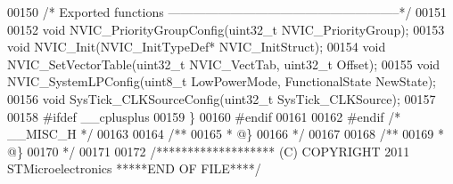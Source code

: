 \begin{DoxyCode}
00150 \textcolor{comment}{/* Exported functions --------------------------------------------------------*/}
00151 
00152 \textcolor{keywordtype}{void} NVIC_PriorityGroupConfig(uint32\_t NVIC\_PriorityGroup);
00153 \textcolor{keywordtype}{void} NVIC_Init(NVIC\_InitTypeDef* NVIC\_InitStruct);
00154 \textcolor{keywordtype}{void} NVIC_SetVectorTable(uint32\_t NVIC\_VectTab, uint32\_t Offset);
00155 \textcolor{keywordtype}{void} NVIC_SystemLPConfig(uint8\_t LowPowerMode, FunctionalState NewState);
00156 \textcolor{keywordtype}{void} SysTick_CLKSourceConfig(uint32\_t SysTick\_CLKSource);
00157 
00158 \textcolor{preprocessor}{#}\textcolor{preprocessor}{ifdef} \_\_cplusplus
00159 \}
00160 \textcolor{preprocessor}{#}\textcolor{preprocessor}{endif}
00161 
00162 \textcolor{preprocessor}{#}\textcolor{preprocessor}{endif} \textcolor{comment}{/* \_\_MISC\_H */}
00163 
00164 \textcolor{comment}{/**}
00165 \textcolor{comment}{  * @\}}
00166 \textcolor{comment}{  */}
00167 
00168 \textcolor{comment}{/**}
00169 \textcolor{comment}{  * @\}}
00170 \textcolor{comment}{  */}
00171 
00172 \textcolor{comment}{/******************* (C) COPYRIGHT 2011 STMicroelectronics *****END OF FILE****/}
\end{DoxyCode}
